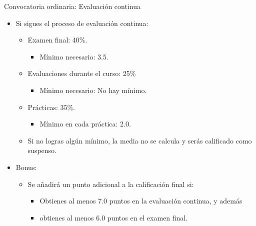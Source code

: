 \begin{frame}[t]{Convocatoria ordinaria: Evaluación continua}
\begin{itemize}
  \item Si sigues el proceso de evaluación continua:
    \begin{itemize}
    \item Examen final: 40\%.
      \begin{itemize}
        \item Mínimo necesario: 3.5.
      \end{itemize}
    \item Evaluaciones durante el curso: 25\%
      \begin{itemize}
        \item Mínimo necesario: \alert{No hay mínimo}.
      \end{itemize}
    \item Prácticas: 35\%.
      \begin{itemize}
        \item Mínimo en cada práctica: 2.0.
      \end{itemize}
    \item Si no logras algún mínimo, la media no se calcula y serás calificado como suspenso.
  \end{itemize}
  \item \alert{Bonus}:
    \begin{itemize}
      \item Se añadirá un punto adicional a la calificación final si:
        \begin{itemize}
          \item Obtienes al menos 7.0 puntos en la evaluación continua, y además
          \item obtienes al menos 6.0 puntos en el examen final.
        \end{itemize}
    \end{itemize}
\end{itemize}
\end{frame}

